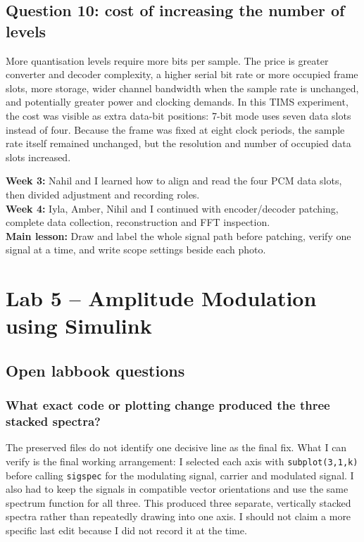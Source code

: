 \documentclass[11pt,a4paper]{article}
\newcommand{\weeklynote}[1]{\begin{notebox}#1\end{notebox}}
\newcommand{\labdivider}{\FloatBarrier\clearpage}
\begin{document}
\subsection{Question 10: cost of increasing the number of levels}
\begin{answerbox}
More quantisation levels require more bits per sample. The price is greater converter and decoder complexity, a higher serial bit rate or more occupied frame slots, more storage, wider channel bandwidth when the sample rate is unchanged, and potentially greater power and clocking demands. In this TIMS experiment, the cost was visible as extra data-bit positions: 7-bit mode uses seven data slots instead of four. Because the frame was fixed at eight clock periods, the sample rate itself remained unchanged, but the resolution and number of occupied data slots increased.
\end{answerbox}
\weeklynote{\textbf{Week 3:} Nahil and I learned how to align and read the four PCM data slots, then divided adjustment and recording roles.\\\textbf{Week 4:} Iyla, Amber, Nihil and I continued with encoder/decoder patching, complete data collection, reconstruction and FFT inspection.\\\textbf{Main lesson:} Draw and label the whole signal path before patching, verify one signal at a time, and write scope settings beside each photo.}
\labdivider
\section{Lab 5 -- Amplitude Modulation using Simulink}
\subsection{Open labbook questions}
\subsubsection*{What exact code or plotting change produced the three stacked spectra?}
\begin{answerbox}
The preserved files do not identify one decisive line as the final fix. What I can verify is the final working arrangement: I selected each axis with \texttt{subplot(3,1,k)} before calling \texttt{sigspec} for the modulating signal, carrier and modulated signal. I also had to keep the signals in compatible vector orientations and use the same spectrum function for all three. This produced three separate, vertically stacked spectra rather than repeatedly drawing into one axis. I should not claim a more specific last edit because I did not record it at the time.
\end{answerbox}
\end{document}
